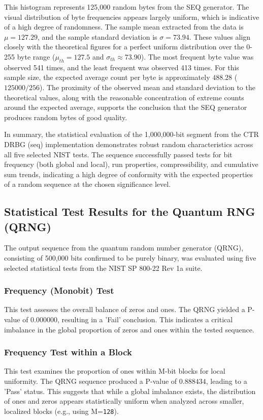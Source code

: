 This histogram represents 125,000 random bytes from the SEQ generator. The visual distribution of byte frequencies appears largely uniform, which is indicative of a high degree of randomness. The sample mean extracted from the data is $\mu = 127.29$, and the sample standard deviation is $\sigma = 73.94$. These values align closely with the theoretical figures for a perfect uniform distribution over the 0-255 byte range ($\mu_{th} = 127.5$ and $\sigma_{th} \approx 73.90$). The most frequent byte value was observed 541 times, and the least frequent was observed 413 times. For this sample size, the expected average count per byte is approximately $488.28$ ($125000 / 256$). The proximity of the observed mean and standard deviation to the theoretical values, along with the reasonable concentration of extreme counts around the expected average, supports the conclusion that the SEQ generator produces random bytes of good quality.

\noindent 

In summary, the statistical evaluation of the 1,000,000-bit segment from the CTR DRBG (seq) implementation demonstrates robust random characteristics across all five selected NIST tests. The sequence successfully passed tests for bit frequency (both global and local), run properties, compressibility, and cumulative sum trends, indicating a high degree of conformity with the expected properties of a random sequence at the chosen significance level.

\subsection{Statistical Test Results for the Quantum RNG (QRNG)}

The output sequence from the quantum random number generator (QRNG), consisting of 500,000 bits confirmed to be purely binary, was evaluated using five selected statistical tests from the NIST SP 800-22 Rev 1a suite.

\subsubsection{\textbf{Frequency (Monobit) Test}}
This test assesses the overall balance of zeros and ones. The QRNG yielded a P-value of $0.000000$, resulting in a 'Fail' conclusion. This indicates a critical imbalance in the global proportion of zeros and ones within the tested sequence.

\subsubsection{\textbf{Frequency Test within a Block}}
This test examines the proportion of ones within M-bit blocks for local uniformity. The QRNG sequence produced a P-value of $0.888434$, leading to a 'Pass' status. This suggests that while a global imbalance exists, the distribution of ones and zeros appears statistically uniform when analyzed across smaller, localized blocks (e.g., using M=\texttt{128}).

